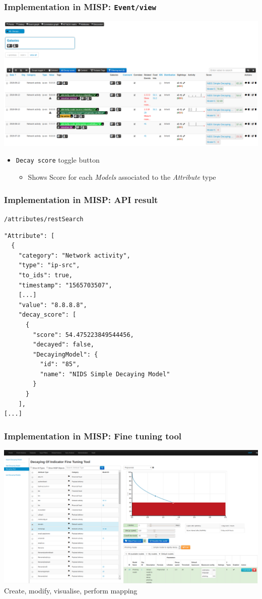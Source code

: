 \begin{frame}
    \frametitle{Implementation in MISP: \texttt{Event/view}}
    \includegraphics[width=1.00\linewidth]{decaying-event.png}
    \begin{itemize}
        \item \texttt{Decay score} toggle button
        \begin{itemize}
            \item Shows Score for each \textit{Models} associated to the \textit{Attribute} type
        \end{itemize}
    \end{itemize}
\end{frame}

\begin{frame}[fragile]
    \frametitle{Implementation in MISP: API result}
    \texttt{/attributes/restSearch}
    \begin{lstlisting}
"Attribute": [
  {
    "category": "Network activity",
    "type": "ip-src",
    "to_ids": true,
    "timestamp": "1565703507",
    [...]
    "value": "8.8.8.8",
    "decay_score": [
      {
        "score": 54.475223849544456,
        "decayed": false,
        "DecayingModel": {
          "id": "85",
          "name": "NIDS Simple Decaying Model"
        }
      }
    ],
[...]
    \end{lstlisting}
\end{frame}

\begin{frame}
    \frametitle{Implementation in MISP: Fine tuning tool}
    \includegraphics[width=1.00\linewidth]{decaying-tool.png}
    Create, modify, visualise, perform mapping
\end{frame}

